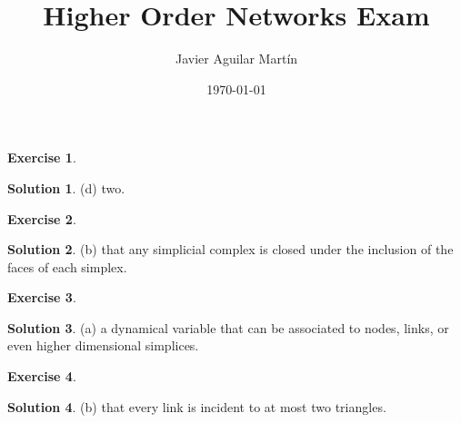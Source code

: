 \documentclass{article}
\theoremstyle{plain}
\theoremstyle{definition}
\newtheorem{exercise}{Exercise}
\newtheorem*{sol*}{Solution}
\begin{document}
\title{Higher Order Networks Exam}
\author{Javier Aguilar Martín}
\date{\today}
\maketitle
\begin{exercise}
\end{exercise}
\begin{sol*}
(d) two.
\end{sol*}

\begin{exercise}
\end{exercise}
\begin{sol*}
(b) that any simplicial complex is closed under the inclusion of the faces
of each simplex.
\end{sol*}

\begin{exercise}
\end{exercise}
\begin{sol*}
(a) a dynamical variable that can be associated to nodes, links, or even
higher dimensional simplices.
\end{sol*}

\begin{exercise}
\end{exercise}
\begin{sol*}
(b) that every link is incident to at most two triangles.
\end{sol*}
\end{document}

